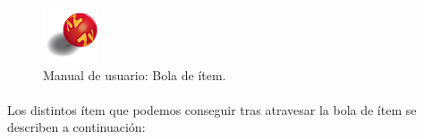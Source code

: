 \begin{figure}[H]
  \label{caja_item}
  \begin{center}
    \includegraphics[scale=1]{imagenes/items/item_box.png}
  \end{center}
 \caption{Manual de usuario: Bola de ítem.}
\end{figure}

\paragraph{}
Los distintos ítem que podemos conseguir tras atravesar la bola de ítem se describen a continuación:

